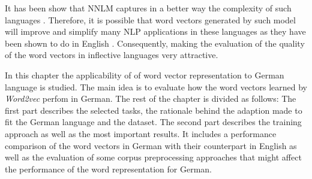 It has been show that \ac{NNLM} captures in a  better  way the complexity of such languages
\cite{conf/icassp/MikolovKBGC09,DBLP:journals/corr/MikolovLS13}.
Therefore, it is possible that word vectors generated by such model  will 
improve  and simplify many \ac{NLP} applications in
these languages as they have been shown to do in
English \cite{collobert:2008,Turian:2010:WRS:1858681.1858721}.
Consequently, making the evaluation of the quality of the word vectors in
inflective languages very attractive.

In this chapter the applicability of of word vector representation to German
language is studied. The main idea is to evaluate how the word vectors
learned by \textit{Word2vec} perfom in German.   The rest of the chapter is
divided as follows: The first part describes the 
selected tasks, the rationale behind the adaption made to fit the German
language and the dataset. The second part describes the training approach as well as the most
important results. It includes  a performance comparison of the word
vectors in German with their counterpart in English as well as  the evaluation of  some corpus
preprocessing approaches that might affect the performance of the word
representation for German.










